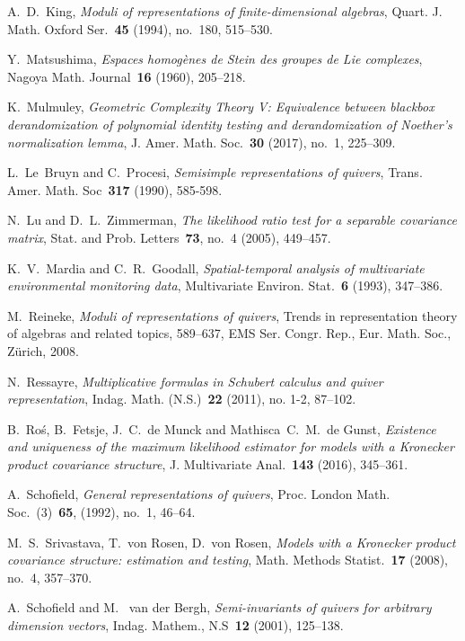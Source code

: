 \documentclass[11pt]{amsart}
\theoremstyle{definition}
\begin{document}
\begin{thebibliography}{99}
A.~D.~King, {\it Moduli of representations of finite-dimensional algebras}, Quart. J. Math. Oxford Ser.~{\bf 45} (1994), no.~180, 515--530.


 Y.~Matsushima, {\it Espaces homog\`enes de {S}tein des groupes de {L}ie complexes}, Nagoya Math. Journal~{\bf 16} (1960), 205--218.


K.~Mulmuley, {\it Geometric Complexity Theory V: Equivalence between blackbox derandomization of polynomial identity testing and 
derandomization of Noether's normalization lemma}, J. Amer. Math. Soc.~{\bf 30} (2017), no.~1, 225--309.



 L.~Le~Bruyn and C.~Procesi, {\it Semisimple representations of quivers}, Trans. Amer. Math. Soc~{\bf 317} (1990), 585-598.

 N.~Lu and D.~L.~Zimmerman, {\it The likelihood ratio test for a separable covariance matrix}, Stat. and Prob. Letters~{\bf 73}, no.~4 (2005), 449--457.

 K.~V.~Mardia and C.~R.~Goodall, {\it Spatial-temporal analysis of multivariate environmental monitoring data}, Multivariate Environ. Stat.~{\bf 6} (1993), 347--386.


 M.~Reineke, {\it Moduli of representations of quivers}, Trends in representation theory of algebras and related topics, 589--637,
EMS Ser. Congr. Rep., Eur. Math. Soc., Zürich, 2008.

 N.~Ressayre, {\it Multiplicative formulas in Schubert calculus and quiver representation}, Indag. Math. (N.S.)~{\bf 22} (2011), no. 1-2, 87--102.


 B.~Ro\'s, B.~Fetsje, J.~C.~de Munck and Mathisca~C.~M.~de Gunst, {\it Existence and uniqueness of the maximum likelihood estimator for models with a {K}ronecker product covariance structure}, J. Multivariate Anal.~{\bf 143} (2016), 345--361.

 A.~Schofield, {\it General representations of quivers}, Proc. London Math. Soc.~(3)~{\bf 65}, (1992), no.~1, 46--64.

 M.~S.~Srivastava, T.~von Rosen, D.~von Rosen, {\it Models with a Kronecker product covariance structure: estimation and testing}, Math. Methods Statist.~{\bf 17} (2008), no.~4, 357--370.

  A.~Schofield and M.~ van der Bergh, {\it Semi-invariants of quivers for arbitrary dimension vectors}, Indag. Mathem., N.S~{\bf 12} (2001), 125--138.


\end{thebibliography}
\end{document}
